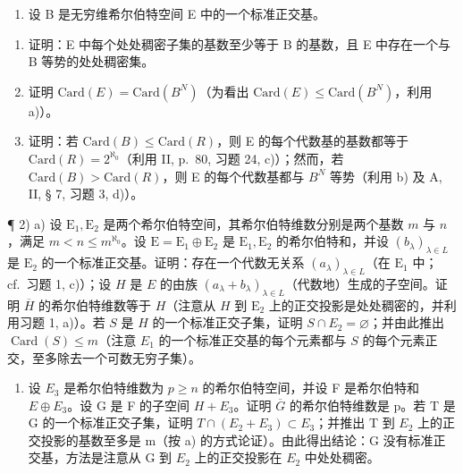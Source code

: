 \exercisegroup

\begin{enumerate}
\def\labelenumi{\arabic{enumi})}
\tightlist
\item
  设 B 是无穷维希尔伯特空间 E 中的一个标准正交基。
\end{enumerate}

\begin{enumerate}
\def\labelenumi{\alph{enumi})}
\tightlist
\item
  证明：E 中每个处处稠密子集的基数至少等于 B 的基数，且 E 中存在一个与 B 等势的处处稠密集。
\item
  证明 \(\text{Card}(E) = \text{Card}(B^{N})\)（为看出 \(\text{Card}(E) \leqslant \text{Card}(B^{N})\)，利用 a)）。
\item
  证明：若 \(\text{Card}(B) \leqslant \text{Card}(R)\)，则 E 的每个代数基的基数都等于 \(\text{Card}(R) = 2^{\aleph_{0}}\)（利用 II, p.~80, 习题 24, c)）；然而，若 \(\text{Card}(B) > \text{Card}(R)\)，则 E 的每个代数基都与 \(B^{N}\) 等势（利用 b) 及 A, II, § 7, 习题 3, d)）。
\end{enumerate}

¶ 2) a) 设 \(\mathrm{E}_1, \mathrm{E}_2\) 是两个希尔伯特空间，其希尔伯特维数分别是两个基数 \(m\) 与 \(n\)，满足 \(m < n \leqslant m^{\aleph_{0}}\)。设 \(\mathrm{E} = \mathrm{E}_1 \oplus \mathrm{E}_2\) 是 \(\mathrm{E}_1, \mathrm{E}_2\) 的希尔伯特和，并设 \((b_\lambda)_{\lambda \in L}\) 是 \(\mathrm{E}_2\) 的一个标准正交基。证明：存在一个代数无关系 \((a_\lambda)_{\lambda \in L}\)（在 \(\mathrm{E}_1\) 中；cf.~习题 1, c)）；设 \(H\) 是 \(E\) 的由族 \((a_\lambda + b_\lambda)_{\lambda \in L}\)（代数地）生成的子空间。证明 \(\overline{H}\) 的希尔伯特维数等于 \(H\)（注意从 \(H\) 到 \(\mathrm{E}_2\) 上的正交投影是处处稠密的，并利用习题 1, a)）。若 \(S\) 是 \(H\) 的一个标准正交子集，证明 \(S \cap E_2 = \varnothing\)；并由此推出 \(\operatorname{Card}(S) \leqslant m\)（注意 \(E_1\) 的一个标准正交基的每个元素都与 \(S\) 的每个元素正交，至多除去一个可数无穷子集）。

\begin{enumerate}
\def\labelenumi{\alph{enumi})}
\setcounter{enumi}{1}
\tightlist
\item
  设 \(E_{3}\) 是希尔伯特维数为 \(p \geqslant n\) 的希尔伯特空间，并设 F 是希尔伯特和 \(E \oplus E_{3}\)。设 G 是 F 的子空间 \(H + E_{3}\)。证明 \(\overline{G}\) 的希尔伯特维数是 p。若 T 是 G 的一个标准正交子集，证明 \(T \cap (E_{2} + E_{3}) \subset E_{3}\)；并推出 T 到 \(E_{2}\) 上的正交投影的基数至多是 m（按 a) 的方式论证）。由此得出结论：G 没有标准正交基，方法是注意从 G 到 \(E_{2}\) 上的正交投影在 \(E_{2}\) 中处处稠密。
\end{enumerate}

